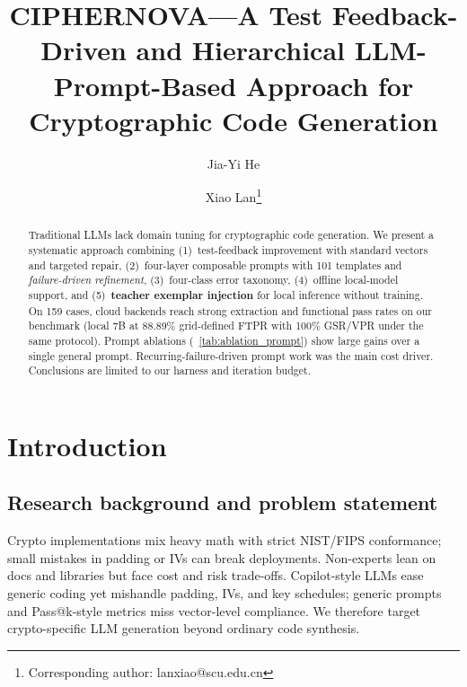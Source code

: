 \documentclass[12pt]{llncs}
\begin{document}
\title{CIPHERNOVA---A Test Feedback-Driven and Hierarchical LLM-Prompt-Based Approach for Cryptographic Code Generation}

\author{Jia-Yi He \and Xiao Lan\thanks{Corresponding author: lanxiao@scu.edu.cn}}
\maketitle

\begin{abstract}
Traditional LLMs lack domain tuning for cryptographic code generation. We present a systematic approach combining (1)~test-feedback improvement with standard vectors and targeted repair, (2)~four-layer composable prompts with 101 templates and \emph{failure-driven refinement}, (3)~four-class error taxonomy, (4)~offline local-model support, and (5)~\textbf{teacher exemplar injection} for local inference without training. On 159 cases, cloud backends reach strong extraction and functional pass rates on our benchmark (local 7B at 88.89\% grid-defined FTPR with 100\% GSR/VPR under the same protocol). Prompt ablations (\tablename~\ref{tab:ablation_prompt}) show large gains over a single general prompt. Recurring-failure-driven prompt work was the main cost driver. Conclusions are limited to our harness and iteration budget.
\end{abstract}


\section{Introduction}
\subsection{Research background and problem statement}
Crypto implementations mix heavy math with strict NIST/FIPS conformance; small mistakes in padding or IVs can break deployments. Non-experts lean on docs and libraries but face cost and risk trade-offs. Copilot-style LLMs ease generic coding yet mishandle padding, IVs, and key schedules; generic prompts and Pass@k-style metrics miss vector-level compliance. We therefore target crypto-specific LLM generation beyond ordinary code synthesis.
\end{document}
